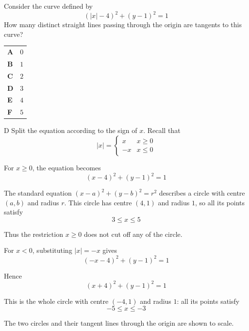 \documentclass[11pt,a4paper]{article}
\begin{document}
\begin{enumerate}[label=\textbf{\arabic*.},leftmargin=*,itemsep=0pt,start=11]
Consider the curve defined by \[ (|x|-4)^2+(y-1)^2=1 \] How many distinct straight lines passing through the origin are tangents to this curve?

\par\vspace*{12pt}
\begin{tabularx}{\linewidth}{@{}>{\bfseries}l Y@{}}
A &
$0$
\\[0.8em]
B &
$1$
\\[0.8em]
C &
$2$
\\[0.8em]
D &
$3$
\\[0.8em]
E &
$4$
\\[0.8em]
F &
$5$
\\
\end{tabularx}

\begin{djsSolution}{D}
Split the equation according to the sign of $x$. Recall that
\[
|x|=\begin{cases}
x & x\ge 0\\[5pt]
-x & x\le 0
\end{cases}
\]

For $x\ge0$, the equation becomes
\[
(x-4)^2+(y-1)^2=1
\]

The standard equation $(x-a)^2+(y-b)^2=r^2$ describes a circle with centre $(a,b)$ and radius $r$. This circle has centre $(4,1)$ and radius $1$, so all its points satisfy
\[
3\le x\le5
\]

Thus the restriction $x\ge0$ does not cut off any of the circle.

For $x<0$, substituting $|x|=-x$ gives
\[
(-x-4)^2+(y-1)^2=1
\]

Hence
\[
(x+4)^2+(y-1)^2=1
\]

This is the whole circle with centre $(-4,1)$ and radius $1$: all its points satisfy
\[
-5\le x\le-3
\]

The two circles and their tangent lines through the origin are shown to scale.

\begin{djsSolutionFigure}
\end{djsSolutionFigure}
\end{djsSolution}
\end{enumerate}
\end{document}

